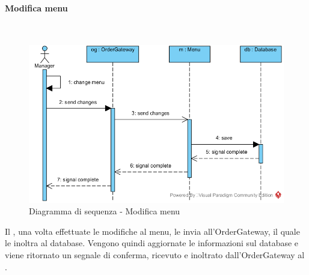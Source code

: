 \begin{samepage}
\paragraph{Modifica menu}\mbox{}\\
\end{samepage}
\begin{figure}[H]
	\centering
	\includegraphics[width=14cm]{../../documenti/SpecificaTecnica/diagrammi_img/sequenza/direttore_modifica_menu.png}
	\caption{Diagramma di sequenza - Modifica menu}
\end{figure}
Il \Manager{}, una volta effettuate le modifiche al menu, le invia all'Order\-Gateway, il quale le inoltra al database. Vengono quindi aggiornate le informazioni sul database e viene ritornato un segnale di conferma, ricevuto e inoltrato dall'Order\-Gateway al \Manager{}.



